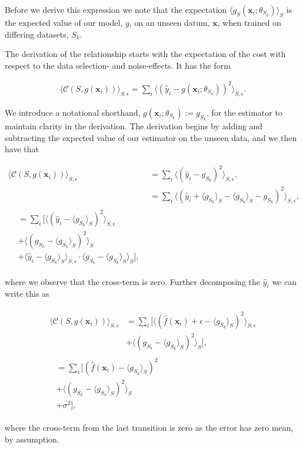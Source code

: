 \noindent Before we derive this expression we note that the expectation $\langle g_S(\boldsymbol{x}_i ; \theta_{S_k}) \rangle_S$ is the expected value of our model, $g$, on an unseen datum, $\boldsymbol{x}$, when trained on differing datasets, $S_k$. 

The derivation of the relationship starts with the expectation of the cost with respect to the data selection- and noise-effects. It has the form 

\begin{align}
\langle \mathcal{C}(S, g(\boldsymbol{x}_i)) \rangle_{S, \epsilon} = \sum _i \langle (\hat{y}_i - g(\boldsymbol{x}_i; \theta_{S_k}))^2 \rangle_{S, \epsilon}.
\end{align}

\noindent We introduce a notational shorthand, $g(\boldsymbol{x}_i; \theta_{S_k}) := g_{S_k}$, for the estimator to maintain clarity in the derivation. The derivation begins by adding and subtracting the expected value of our estimator on the unseen data, and we then have that

\begin{align}
\langle \mathcal{C}(S, g(\boldsymbol{x}_i)) \rangle_{S, \epsilon} &= \sum _i \langle (\hat{y}_i - g_{S_k})^2 \rangle_{S, \epsilon}, \\
&= \sum _i \langle (\hat{y}_i  + \langle g_{S_k}\rangle_S - \langle g_{S_k}\rangle_S  - g_{S_k})^2 \rangle_{S, \epsilon}, \\
\begin{split} 
&= \sum_i [\langle (\hat{y}_i  - \langle g_{S_k}\rangle_S )^2 \rangle_{S, \epsilon}\\
& + \langle (g_{S_k} - \langle g_{S_k}\rangle_S)^2 \rangle_{S}\\
& + \langle \hat{y}_i  - \langle g_{S_k}\rangle_S\rangle_{S, \epsilon} \cdot \langle g_{S_k} - \langle g_{S_k}\rangle_S \rangle_S ],
\end{split}
\end{align}

\noindent where we observe that the cross-term is zero. Further decomposing the $\hat{y}_i$ we can write this as 

\begin{align}
\begin{split}
\langle \mathcal{C}(S, g(\boldsymbol{x}_i)) \rangle_{S, \epsilon} &=
\sum_i [\langle (\hat{f}(\boldsymbol{x}_i) + \epsilon  - \langle g_{S_k}\rangle_S )^2 \rangle_{S, \epsilon}\\
& + \langle (g_{S_k} - \langle g_{S_k}\rangle_S)^2 \rangle_{S}],
\end{split} \\
\begin{split}
 &= \sum_i [(\hat{f}(\boldsymbol{x}_i) - \langle g_{S_k}\rangle_S )^2 \\
 &+ \langle (g_{S_k} - \langle g_{S_k}\rangle_S)^2 \rangle_{S}\\
 &+\sigma^2 ],
\end{split}
\end{align}

\noindent where the cross-term from the last transition is zero as the error has zero mean, by assumption. 
